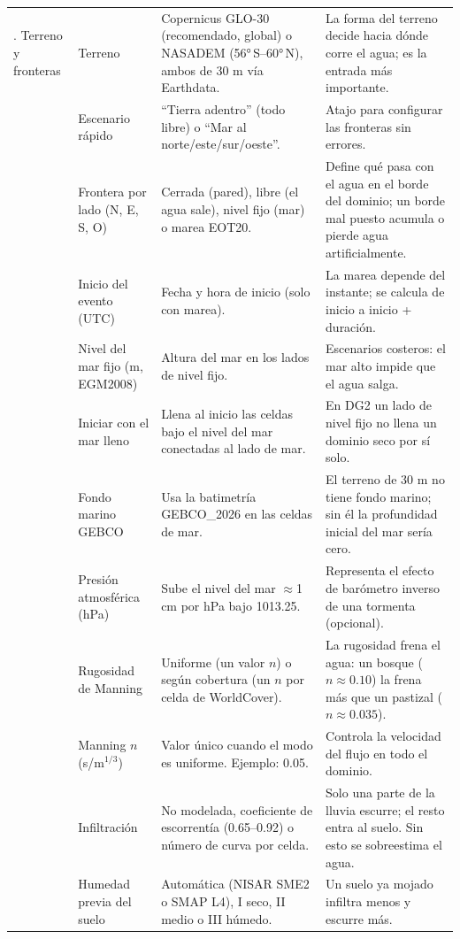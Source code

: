 \documentclass[11pt,letterpaper]{article}
\begin{document}
{\begin{longtable}{>{\raggedright\arraybackslash}p{2.1cm}>{\raggedright\arraybackslash}p{3.0cm}>{\raggedright\arraybackslash}p{5.3cm}>{\raggedright\arraybackslash}p{5.2cm}}
3. Terreno y fronteras & Terreno & Copernicus GLO-30 (recomendado, global) o NASADEM (56°\,S–60°\,N), ambos de 30 m vía Earthdata. & La forma del terreno decide hacia dónde corre el agua; es la entrada más importante.\\
 & Escenario rápido & ``Tierra adentro'' (todo libre) o ``Mar al norte/este/sur/oeste''. & Atajo para configurar las fronteras sin errores.\\
 & Frontera por lado (N, E, S, O) & Cerrada (pared), libre (el agua sale), nivel fijo (mar) o marea EOT20. & Define qué pasa con el agua en el borde del dominio; un borde mal puesto acumula o pierde agua artificialmente.\\
 & Inicio del evento (UTC) & Fecha y hora de inicio (solo con marea). & La marea depende del instante; se calcula de inicio a inicio + duración.\\
 & Nivel del mar fijo (m, EGM2008) & Altura del mar en los lados de nivel fijo. & Escenarios costeros: el mar alto impide que el agua salga.\\
 & Iniciar con el mar lleno & Llena al inicio las celdas bajo el nivel del mar conectadas al lado de mar. & En DG2 un lado de nivel fijo no llena un dominio seco por sí solo.\\
 & Fondo marino GEBCO & Usa la batimetría GEBCO\_2026 en las celdas de mar. & El terreno de 30 m no tiene fondo marino; sin él la profundidad inicial del mar sería cero.\\
 & Presión atmosférica (hPa) & Sube el nivel del mar $\approx$1 cm por hPa bajo 1013.25. & Representa el efecto de barómetro inverso de una tormenta (opcional).\\
 & Rugosidad de Manning & Uniforme (un valor $n$) o según cobertura (un $n$ por celda de WorldCover). & La rugosidad frena el agua: un bosque ($n\approx0.10$) la frena más que un pastizal ($n\approx0.035$).\\
 & Manning $n$ (s/m$^{1/3}$) & Valor único cuando el modo es uniforme. Ejemplo: 0.05. & Controla la velocidad del flujo en todo el dominio.\\
 & Infiltración & No modelada, coeficiente de escorrentía (0.65–0.92) o número de curva por celda. & Solo una parte de la lluvia escurre; el resto entra al suelo. Sin esto se sobreestima el agua.\\
 & Humedad previa del suelo & Automática (NISAR SME2 o SMAP L4), I seco, II medio o III húmedo. & Un suelo ya mojado infiltra menos y escurre más.\\

\end{longtable}}
\end{document}
